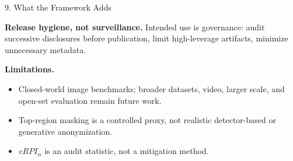 \documentclass[final]{article}
\newcommand{\fsBody}{\fontsize{25}{29}}   %
\newcommand{\smallbody}{\fsBody\selectfont}
\newcommand{\mhead}[1]{\textbf{\color{navy}#1}}
\begin{document}
\begin{minipage}[t]{\textwidth}
\begin{minipage}[t]{0.292\textwidth}
\begin{sectionbox}{9. What the Framework Adds}
\vspace{0.0635in}
\begin{tcolorbox}[colback=softgreen,colframe=green,left=0.12in,right=0.12in,top=0.084in,bottom=0.084in]
\smallbody
\textbf{Release hygiene, not surveillance.} Intended use is governance: audit successive disclosures before publication, limit high-leverage artifacts, minimize unnecessary metadata.
\end{tcolorbox}

\vspace{0.115in}
\mhead{Limitations.}
\begin{itemize}
  \item Closed-world image benchmarks; broader datasets, video, larger scale, and open-set evaluation remain future work.
  \item Top-region masking is a controlled proxy, not realistic detector-based or generative anonymization.
  \item $vRPI_\alpha$ is an audit statistic, not a mitigation method.
\end{itemize}
\end{sectionbox}

\end{minipage}


\end{minipage}
\end{document}
